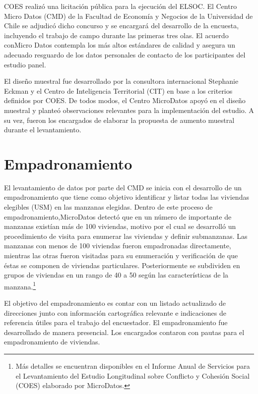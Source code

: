 \documentclass[
]{book}
\begin{document}
COES realizó una licitación pública para la ejecución del ELSOC. El Centro Micro Datos (CMD) de la Facultad de Economía y Negocios de la Universidad de Chile se adjudicó dicho concurso y se encargará del desarrollo de la encuesta, incluyendo el trabajo de campo durante las primeras tres olas. El acuerdo conMicro Datos contempla los más altos estándares de calidad y asegura un adecuado resguardo de los datos personales de contacto de los participantes del estudio panel.

El diseño muestral fue desarrollado por la consultora internacional Stephanie Eckman y el Centro de Inteligencia Territorial (CIT) en base a los criterios definidos por COES. De todos modos, el Centro MicroDatos apoyó en el diseño muestral y planteó observaciones relevantes para la implementación del estudio. A su vez, fueron los encargados de elaborar la propuesta de aumento muestral durante el levantamiento.

\hypertarget{empadronamiento}{%
\section{Empadronamiento}\label{empadronamiento}}

El levantamiento de datos por parte del CMD se inicia con el desarrollo de un empadronamiento que tiene como objetivo identificar y listar todas las viviendas elegibles (USM) en las manzanas elegidas. Dentro de este proceso de empadronamiento,MicroDatos detectó que en un número de importante de manzanas existían más de 100 viviendas, motivo por el cual se desarrolló un procedimiento de visita para enumerar las viviendas y definir submanzanas. Las manzanas con menos de 100 viviendas fueron empadronadas directamente, mientras las otras fueron visitadas para su enumeración y verificación de que éstas se componen de viviendas particulares. Posteriormente se subdividen en grupos de viviendas en un rango de 40 a 50 según las características de la manzana.\footnote{Más detalles se encuentran disponibles en el Informe Anual de Servicios para el Levantamiento del Estudio Longitudinal sobre Conflicto y Cohesión Social (COES) elaborado por MicroDatos.}

El objetivo del empadronamiento es contar con un listado actualizado de direcciones junto con información cartográfica relevante e indicaciones de referencia útiles para el trabajo del encuestador. El empadronamiento fue desarrollado de manera presencial. Los encargados contaron con pautas para el empadronamiento de viviendas.
\end{document}
